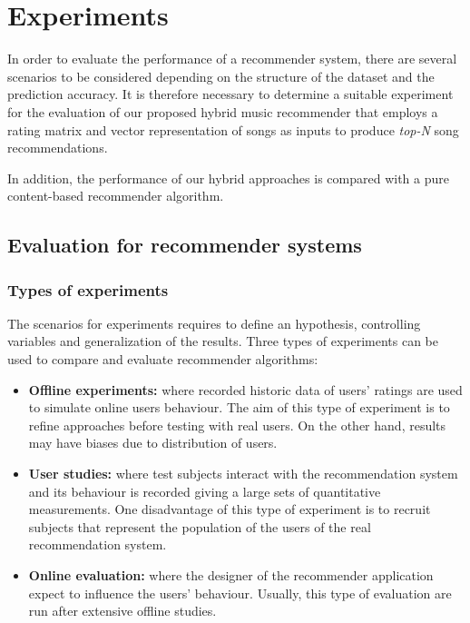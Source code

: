 \chapter{Experiments}
\label{ch:experiments}
In order to evaluate the performance of a recommender system, there are several scenarios to be considered depending on the structure of the dataset and the prediction accuracy. It is therefore necessary to determine a suitable experiment for the evaluation of our proposed hybrid music recommender that employs a rating matrix and vector representation of songs as inputs to produce \textit{top-N} song recommendations.

In addition, the performance of our hybrid approaches is compared with a pure content-based recommender algorithm.


\section{Evaluation for recommender systems}

\subsection{Types of experiments}
The scenarios for experiments requires to define an hypothesis, controlling variables and generalization of the results. Three types of experiments \parencite{export:115396} can be used to compare and evaluate recommender algorithms:
\begin{itemize}
\item \textbf{Offline experiments:} where recorded historic data of users' ratings are used to simulate online users behaviour. The aim of this type of experiment is to refine approaches before testing with real users. On the other hand, results may have biases due to distribution of users.
\item \textbf{User studies:} where test subjects interact with the recommendation system and its behaviour is recorded giving a large sets of quantitative measurements. One disadvantage of this type of experiment is to recruit subjects that represent the population of the users of the real recommendation system.
\item \textbf{Online evaluation:} where the designer of the recommender application expect to influence the users' behaviour. Usually, this type of evaluation are run after extensive offline studies.
\end{itemize}

